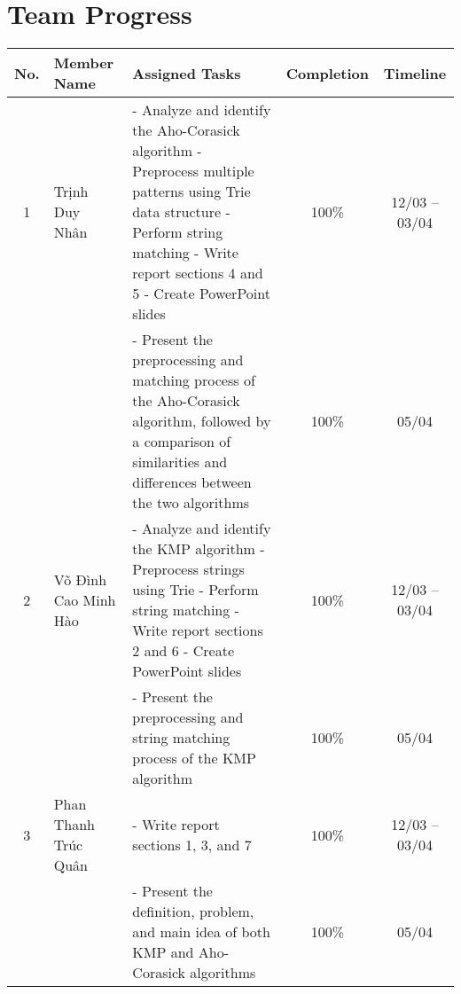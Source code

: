 \section{Team Progress}
\hspace*{-3.5cm}
\begin{longtable}{|c|>{\raggedright\arraybackslash}p{2.8cm}|>{\centering\arraybackslash}p{8cm}|c|c|}
\hline
\textbf{No.} & \textbf{Member Name} & \textbf{Assigned Tasks} & \textbf{Completion} & \textbf{Timeline} \\
\hline
1 & Trịnh Duy Nhân &
\raggedright
- Analyze and identify the Aho-Corasick algorithm \newline
- Preprocess multiple patterns using Trie data structure \newline
- Perform string matching \newline
- Write report sections 4 and 5 \newline
- Create PowerPoint slides &
100\% & 12/03 – 03/04 \\
\cline{3-5}
& &
\raggedright
- Present the preprocessing and matching process of the Aho-Corasick algorithm, followed by a comparison of similarities and differences between the two algorithms &
100\% & 05/04 \\
\hline
2 & Võ Đình Cao Minh Hào &
\raggedright
- Analyze and identify the KMP algorithm \newline
- Preprocess strings using Trie \newline
- Perform string matching \newline
- Write report sections 2 and 6 \newline
- Create PowerPoint slides &
100\% & 12/03 – 03/04 \\
\cline{3-5}
& &
\raggedright
- Present the preprocessing and string matching process of the KMP algorithm &
100\% & 05/04 \\
\hline
3 & Phan Thanh Trúc Quân &
\raggedright
- Write report sections 1, 3, and 7 &
100\% & 12/03 – 03/04 \\
\cline{3-5}
& &
\raggedright
- Present the definition, problem, and main idea of both KMP and Aho-Corasick algorithms &
100\% & 05/04 \\
\hline
\end{longtable}

